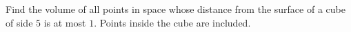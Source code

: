 Find the volume of all points in space whose distance from the surface of a cube of side $5$ is at most $1$. Points inside the cube are included.
